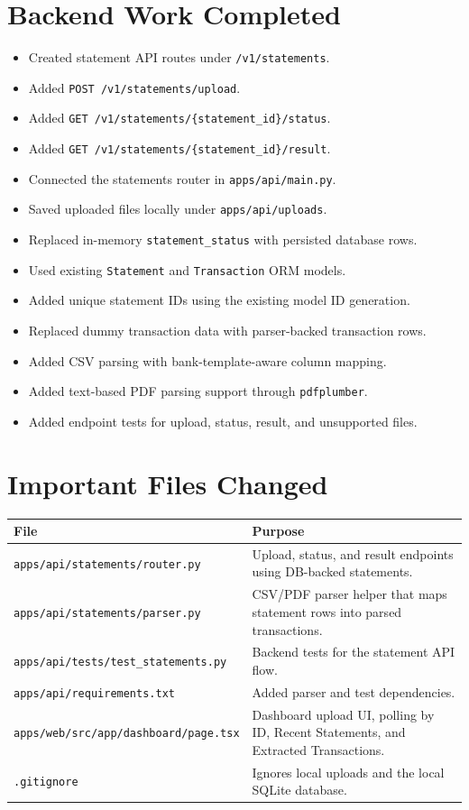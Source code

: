 \documentclass[11pt,a4paper]{article}
\begin{document}
\section{Backend Work Completed}

\begin{itemize}[leftmargin=*]
  \item Created statement API routes under \texttt{/v1/statements}.
  \item Added \texttt{POST /v1/statements/upload}.
  \item Added \texttt{GET /v1/statements/\{statement\_id\}/status}.
  \item Added \texttt{GET /v1/statements/\{statement\_id\}/result}.
  \item Connected the statements router in \texttt{apps/api/main.py}.
  \item Saved uploaded files locally under \texttt{apps/api/uploads}.
  \item Replaced in-memory \texttt{statement\_status} with persisted database rows.
  \item Used existing \texttt{Statement} and \texttt{Transaction} ORM models.
  \item Added unique statement IDs using the existing model ID generation.
  \item Replaced dummy transaction data with parser-backed transaction rows.
  \item Added CSV parsing with bank-template-aware column mapping.
  \item Added text-based PDF parsing support through \texttt{pdfplumber}.
  \item Added endpoint tests for upload, status, result, and unsupported files.
\end{itemize}

\section{Important Files Changed}

\begin{longtable}{p{}p{}}
\textbf{File} & \textbf{Purpose} \\
\hline
\texttt{apps/api/statements/router.py} & Upload, status, and result endpoints using DB-backed statements. \\
\texttt{apps/api/statements/parser.py} & CSV/PDF parser helper that maps statement rows into parsed transactions. \\
\texttt{apps/api/tests/test\_statements.py} & Backend tests for the statement API flow. \\
\texttt{apps/api/requirements.txt} & Added parser and test dependencies. \\
\texttt{apps/web/src/app/dashboard/page.tsx} & Dashboard upload UI, polling by ID, Recent Statements, and Extracted Transactions. \\
\texttt{.gitignore} & Ignores local uploads and the local SQLite database. \\
\end{longtable}
\end{document}
